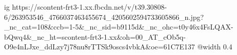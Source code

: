  
 
 
 
 

\ifcmt
  ig https://scontent-frt3-1.xx.fbcdn.net/v/t39.30808-6/263953546_4766037463455674_4205602594733605866_n.jpg?_nc_cat=108&ccb=1-5&_nc_sid=b9115d&_nc_ohc=t0y46x4FsLQAX-bQwq4&_nc_ht=scontent-frt3-1.xx&oh=00_AT_cOb5q-O9e4nLJxe_ddLzy7j78nu8rTTSk9oscs4vbkA&oe=61C7E137
  @width 0.4
\fi

